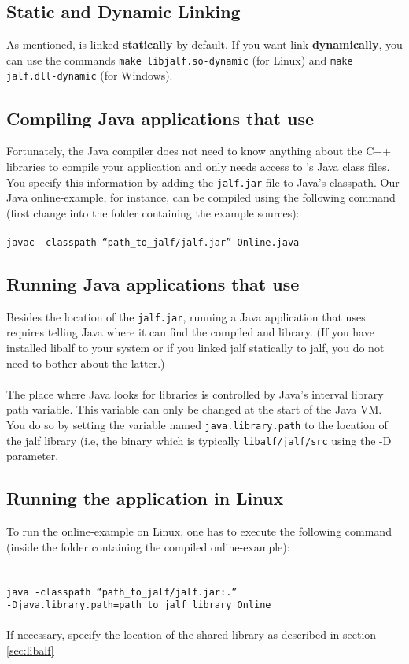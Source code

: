 \subsection*{Static and Dynamic Linking}
As mentioned, \libalf is linked \textbf{statically} by default. If you want link \libalf \textbf{dynamically}, you can use the commands \texttt{make libjalf.so-dynamic} (for Linux) and \texttt{make jalf.dll-dynamic} (for Windows).

\subsection{Compiling Java applications that use \jalf}
Fortunately, the Java compiler does not need to know anything about the C++ libraries to compile your application and only needs access to \jalf’s Java class files. You specify this information by adding the \texttt{jalf.jar} file to Java’s classpath. Our Java online-example, for instance, can be compiled using the following command (first change into the folder containing the example sources):
\\ \\
\texttt{javac -classpath ``path\_to\_jalf/jalf.jar'' Online.java}

\subsection{Running Java applications that use \jalf}
Besides the location of the \texttt{jalf.jar}, running a Java application that uses \jalf requires telling Java where it can find the compiled \jalf and \libalf library. (If you have installed libalf to your system or if you linked jalf statically to jalf, you do not need to bother about the latter.)
\paragraph{}
The place where Java looks for \cpp libraries is controlled by Java’s interval library path variable. This variable can only be changed at the start of the Java VM. You do so by setting the variable named \texttt{java.library.path} to the location of the jalf library (i.e, the \jalf \cpp binary which is typically \texttt{libalf/jalf/src} using the -D parameter. 
\subsection*{Running the application in Linux}
To run the online-example on Linux, one has to execute the following command (inside the folder containing the compiled online-example):
\\ \\ \\
\texttt{java -classpath ``path\_to\_jalf/jalf.jar:.'' \\ \hspace*{25pt} -Djava.library.path=path\_to\_jalf\_library Online}
\\ \\
If necessary, specify the location of the shared \libalf library as described in section \ref{sec:libalf}

